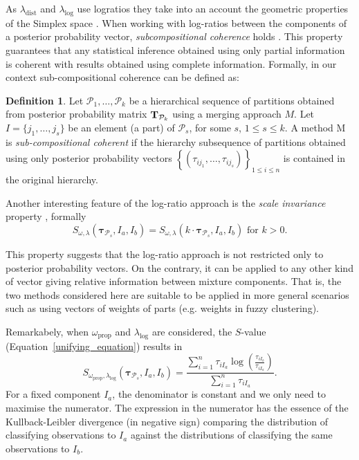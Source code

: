 \documentclass[submit]{smj}
\theoremstyle{definition}
\newtheorem{defn}{Definition}[section]
\newcommand{\m}[1]{\boldsymbol{#1}}
\begin{document}
As $\lambda_{\text{dist}}$ and $\lambda_{\log}$ use logratios they take into an account the geometric properties of the Simplex space \citep{aitchison2002simplicial}.  When working with log-ratios between the components of a posterior probability vector,  \emph{subcompositional coherence} holds  \citep{aitchison1986statistical}. This property guarantees that any statistical inference obtained using only partial information is coherent with results obtained using complete information. Formally, in our context sub-compositional coherence can be defined as:

\begin{defn}
Let $\mathcal{P}_1, \dots, \mathcal{P}_k$ be a hierarchical sequence of partitions obtained from posterior probability matrix $\text{\textbf{T}}_{\mathcal{P}_k}$ using a merging approach $M$. Let $I = \{j_1, \dots, j_s\}$ be an element (a part) of $\mathcal{P}_s$, for some $s$, $1\leq s \leq k$. A method M is \emph{sub-compositional coherent} if the hierarchy subsequence of partitions obtained  using only posterior probability vectors $\left\{ \left(\tau_{ij_1}, \dots, \tau_{ij_s} \right)\right\}_{1\leq i \leq n}$ is contained in the original hierarchy.
\end{defn}

Another interesting feature of the log-ratio approach is the \emph{scale invariance} property \citep{aitchison1986statistical}, formally
\[
S_{\omega, \lambda}( \m\tau_{\mathcal{P}_s},  I_a,  I_b) = S_{\omega, \lambda}(k\cdot \m\tau_{\mathcal{P}_s},  I_a,  I_b) \text{ for $k>0$.}
\] 

This property suggests that the log-ratio approach is not restricted only to posterior probability vectors. On the contrary, it can be applied to any other kind of vector giving relative information between mixture components. That is, the two methods considered here are suitable to be applied in more general scenarios such as using vectors of weights of parts (e.g. weights in fuzzy clustering).

Remarkabely, when $\omega_{\text{prop}}$ and $\lambda_{\log}$ are considered, the $S$-value (Equation~\ref{unifying_equation}) results in
\[
S_{\omega_{\text{prop}}, \lambda_{\log}}( \m\tau_{\mathcal{P}_s},  I_a,  I_b) = \frac{\sum_{i=1}^n \tau_{iI_a}  \log \left(\frac{ \tau_{iI_b} }{ \tau_{iI_a} }\right)}{\sum_{i=1}^n \tau_{iI_a}}.
\]
For a fixed component $I_a$, the denominator is constant and we only need to maximise the numerator. The expression in the numerator has the essence of the Kullback-Leibler divergence (in negative sign) comparing the distribution of classifying observations to $I_a$ against the distributions of classifying the same observations to $I_b$.
\end{document}
